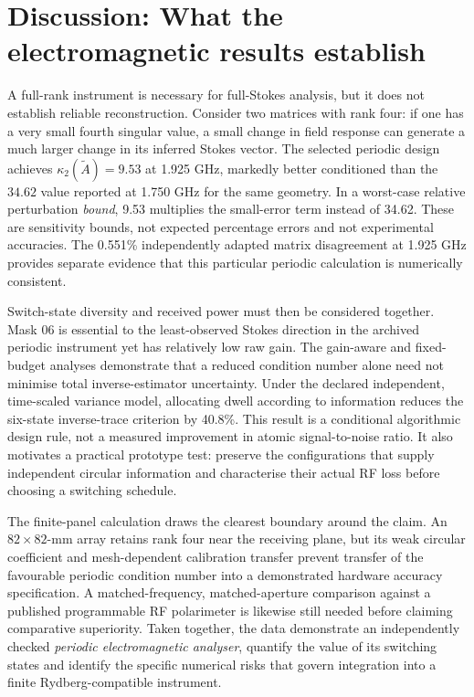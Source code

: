 \documentclass{ieeeaccess}
\begin{document}
\section{Discussion: What the electromagnetic results establish}
A full-rank instrument is necessary for full-Stokes analysis, but it does not establish reliable reconstruction. Consider two matrices with rank four: if one has a very small fourth singular value, a small change in field response can generate a much larger change in its inferred Stokes vector. The selected periodic design achieves $\kappa_2(\widetilde A)=9.53$ at 1.925 GHz, markedly better conditioned than the $34.62$ value reported at 1.750 GHz for the same geometry. In a worst-case relative perturbation \emph{bound}, 9.53 multiplies the small-error term instead of 34.62. These are sensitivity bounds, not expected percentage errors and not experimental accuracies. The 0.551\% independently adapted matrix disagreement at 1.925 GHz provides separate evidence that this particular periodic calculation is numerically consistent.

Switch-state diversity and received power must then be considered together. Mask 06 is essential to the least-observed Stokes direction in the archived periodic instrument yet has relatively low raw gain. The gain-aware and fixed-budget analyses demonstrate that a reduced condition number alone need not minimise total inverse-estimator uncertainty. Under the declared independent, time-scaled variance model, allocating dwell according to information reduces the six-state inverse-trace criterion by 40.8\%. This result is a conditional algorithmic design rule, not a measured improvement in atomic signal-to-noise ratio. It also motivates a practical prototype test: preserve the configurations that supply independent circular information and characterise their actual RF loss before choosing a switching schedule.

The finite-panel calculation draws the clearest boundary around the claim. An $82\times82$-mm array retains rank four near the receiving plane, but its weak circular coefficient and mesh-dependent calibration transfer prevent transfer of the favourable periodic condition number into a demonstrated hardware accuracy specification. A matched-frequency, matched-aperture comparison against a published programmable RF polarimeter \cite{Chen2025Reconfigurable} is likewise still needed before claiming comparative superiority. Taken together, the data demonstrate an independently checked \emph{periodic electromagnetic analyser}, quantify the value of its switching states and identify the specific numerical risks that govern integration into a finite Rydberg-compatible instrument.
\end{document}
